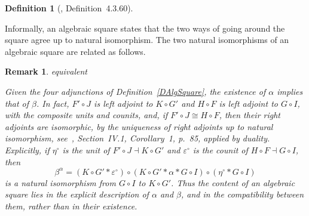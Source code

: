 \documentclass[a4paper, reqno]{amsbook}
\makeatletter
\theoremstyle{plain}
\newtheorem{remark}[theorem]{Remark}
\theoremstyle{definition}
\newtheorem{definition}[theorem]{Definition}
\newcommand*{\CA@leanpending}{}
\newcommand*{\CA@leanrelation}{}
\newcommand*{\lean}[2]{%
  \ifcsname\string\color@lean@#1\endcsname\else
    \PackageError{main}{Unknown relation `#1' in \string\lean}{Use equivalent, weaker or stronger.}%
  \fi
  \gdef\CA@leanrelation{#1}%
  \gdef\CA@leanpending{#2}}
\makeatother
\begin{document}
\begin{definition}[\cite{Soliveres2000}, Definition~4.3.60]
\begin{center}
\end{center}
\end{definition}

Informally, an algebraic square states that the two ways of going around the square agree up to natural isomorphism.
The two natural isomorphisms of an algebraic square are related as follows.

\begin{remark}\label{RAlgSquareMate}\lean{equivalent}{AlgebraicSquare.conjugateIso,AlgebraicSquare.conjugateIso_hom_app}
Given the four adjunctions of Definition~\ref{DAlgSquare}, the existence of $\alpha$ implies that of $\beta$.
In fact, $F'\circ J$ is left adjoint to $K\circ G'$ and $H\circ F$ is left adjoint to $G\circ I$, with the composite units and counits, and, if $F'\circ J\cong H\circ F$, then their right adjoints are isomorphic, by the uniqueness of right adjoints up to natural isomorphism, see~\cite{MacLane1998}, Section~IV.1, Corollary~1, p.~85, applied by duality.
Explicitly, if $\eta^{\circ}$ is the unit of $F'\circ J\dashv K\circ G'$ and $\varepsilon^{\circ}$ is the counit of $H\circ F\dashv G\circ I$, then
$$
\beta^{\alpha}=\left(K\circ G'\ast\varepsilon^{\circ}\right)\circ\left(K\circ G'\ast\alpha\ast G\circ I\right)\circ\left(\eta^{\circ}\ast G\circ I\right)
$$
is a natural isomorphism from $G\circ I$ to $K\circ G'$.
Thus the content of an algebraic square lies in the explicit description of $\alpha$ and $\beta$, and in the compatibility between them, rather than in their existence.
\end{remark}
\end{document}
